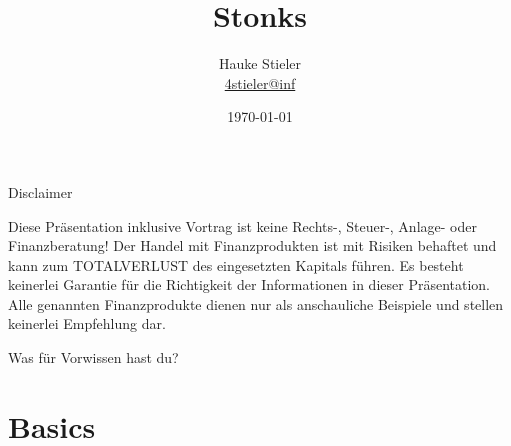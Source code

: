 \documentclass{beamer}
\author[Hauke Stieler]{Hauke Stieler\\\href{mailto:4stieler@informatik.uni-hamburg.de}{4stieler@inf}}
\title{Stonks}
\date{\today}
\begin{document}
	{
		\maketitle
	}
	
	\begin{frame}{Disclaimer}
		\begin{center}
			Diese Präsentation inklusive Vortrag ist keine Rechts-, Steuer-, Anlage- oder Finanzberatung!\n
			Der Handel mit Finanzprodukten ist mit Risiken behaftet und kann zum TOTALVERLUST des eingesetzten Kapitals führen.\n
			Es besteht keinerlei Garantie für die Richtigkeit der Informationen in dieser Präsentation.\n
			Alle genannten Finanzprodukte dienen nur als anschauliche Beispiele und stellen keinerlei Empfehlung dar.
		\end{center}
	\end{frame}

	\begin{frame}
		\begin{center}
			Was für Vorwissen hast du?
		\end{center}
	\end{frame}

	\begin{frame}
		\tableofcontents[hidesubsections]
	\end{frame}
	
	\section{Basics}
	
\end{document}
